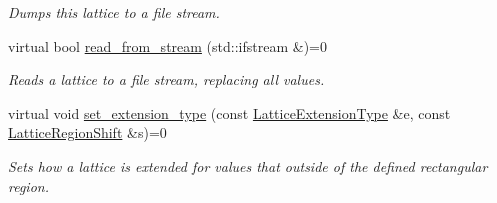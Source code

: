 \begin{DoxyCompactItemize}
\begin{DoxyCompactList}\small\item\em Dumps this lattice to a file stream. \end{DoxyCompactList}\item 
\mbox{\label{classsisl_1_1base__lattice_ad81c46a32112789f61bcab1e090ec95d}} 
virtual bool \hyperlink{classsisl_1_1base__lattice_ad81c46a32112789f61bcab1e090ec95d}{read\+\_\+from\+\_\+stream} (std\+::ifstream \&)=0
\begin{DoxyCompactList}\small\item\em Reads a lattice to a file stream, replacing all values. \end{DoxyCompactList}\item 
\mbox{\label{classsisl_1_1base__lattice_ac19afb43147c6c4443123b982af3417d}} 
virtual void \hyperlink{classsisl_1_1base__lattice_ac19afb43147c6c4443123b982af3417d}{set\+\_\+extension\+\_\+type} (const \hyperlink{namespacesisl_aaf1f41d23ed37dacaa4c9f1bb6d3324f}{Lattice\+Extension\+Type} \&e, const \hyperlink{namespacesisl_af139f6f74488292ae48c0d71eaa5d4f1}{Lattice\+Region\+Shift} \&s)=0
\begin{DoxyCompactList}\small\item\em Sets how a lattice is extended for values that outside of the defined rectangular region. \end{DoxyCompactList}\end{DoxyCompactItemize}
